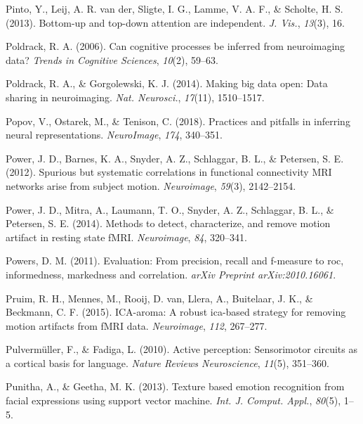\documentclass[11pt,american,a4paper,oneside,]{memoir} %
\begin{document}
\leavevmode\hypertarget{ref-Pinto2013-kh}{}%
Pinto, Y., Leij, A. R. van der, Sligte, I. G., Lamme, V. A. F., \& Scholte, H. S. (2013). Bottom-up and top-down attention are independent. \emph{J. Vis.}, \emph{13}(3), 16.

\leavevmode\hypertarget{ref-poldrack2006can}{}%
Poldrack, R. A. (2006). Can cognitive processes be inferred from neuroimaging data? \emph{Trends in Cognitive Sciences}, \emph{10}(2), 59--63.

\leavevmode\hypertarget{ref-Poldrack2014-ov}{}%
Poldrack, R. A., \& Gorgolewski, K. J. (2014). Making big data open: Data sharing in neuroimaging. \emph{Nat. Neurosci.}, \emph{17}(11), 1510--1517.

\leavevmode\hypertarget{ref-popov2018practices}{}%
Popov, V., Ostarek, M., \& Tenison, C. (2018). Practices and pitfalls in inferring neural representations. \emph{NeuroImage}, \emph{174}, 340--351.

\leavevmode\hypertarget{ref-Power2012-kt}{}%
Power, J. D., Barnes, K. A., Snyder, A. Z., Schlaggar, B. L., \& Petersen, S. E. (2012). Spurious but systematic correlations in functional connectivity MRI networks arise from subject motion. \emph{Neuroimage}, \emph{59}(3), 2142--2154.

\leavevmode\hypertarget{ref-Power2014-gh}{}%
Power, J. D., Mitra, A., Laumann, T. O., Snyder, A. Z., Schlaggar, B. L., \& Petersen, S. E. (2014). Methods to detect, characterize, and remove motion artifact in resting state fMRI. \emph{Neuroimage}, \emph{84}, 320--341.

\leavevmode\hypertarget{ref-powers2020evaluation}{}%
Powers, D. M. (2011). Evaluation: From precision, recall and f-measure to roc, informedness, markedness and correlation. \emph{arXiv Preprint arXiv:2010.16061}.

\leavevmode\hypertarget{ref-pruim2015ica}{}%
Pruim, R. H., Mennes, M., Rooij, D. van, Llera, A., Buitelaar, J. K., \& Beckmann, C. F. (2015). ICA-aroma: A robust ica-based strategy for removing motion artifacts from fMRI data. \emph{Neuroimage}, \emph{112}, 267--277.

\leavevmode\hypertarget{ref-pulvermuller2010active}{}%
Pulvermüller, F., \& Fadiga, L. (2010). Active perception: Sensorimotor circuits as a cortical basis for language. \emph{Nature Reviews Neuroscience}, \emph{11}(5), 351--360.

\leavevmode\hypertarget{ref-Punitha2013-jy}{}%
Punitha, A., \& Geetha, M. K. (2013). Texture based emotion recognition from facial expressions using support vector machine. \emph{Int. J. Comput. Appl.}, \emph{80}(5), 1--5.
\end{document}
